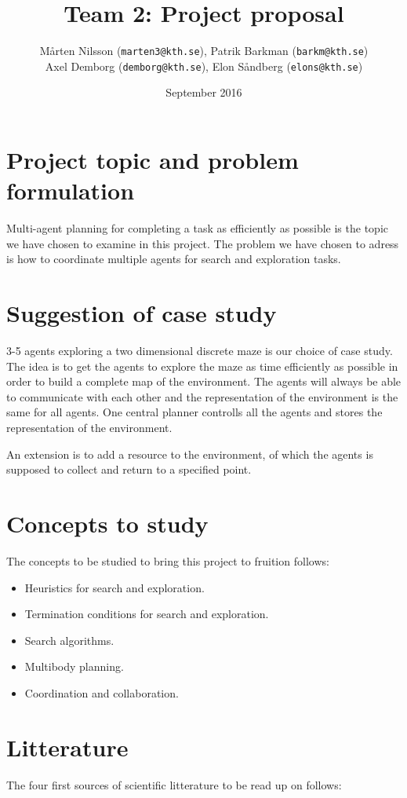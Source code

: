 \documentclass{article}
\title{Team 2: Project proposal}
\author{ Mårten Nilsson (\texttt{marten3@kth.se}), Patrik Barkman (\texttt{barkm@kth.se})\\ Axel Demborg (\texttt{demborg@kth.se}), Elon Såndberg (\texttt{elons@kth.se})}
\date{September 2016}
\begin{document}
\maketitle

\thispagestyle{empty}


\section{Project topic and problem formulation}
Multi-agent planning for completing a task as efficiently as possible is the topic we have chosen to examine in this project. The problem we have chosen to adress is how to coordinate multiple agents for search and exploration tasks.  

\section{Suggestion of case study}

3-5 agents exploring a two dimensional discrete maze is our choice of case study. The idea is to get the agents to explore the maze as time efficiently as possible in order to build a complete map of the environment. The agents will always be able to communicate with each other and the representation of the environment is the same for all agents. One central planner controlls all the agents and stores the representation of the environment. 

An extension is to add a resource to the environment, of which the agents is supposed to collect and return to a specified point.  

\section{Concepts to study}
The concepts to be studied to bring this project to fruition follows:

\begin{itemize}
\item Heuristics for search and exploration. 
\item Termination conditions for search and exploration.
\item Search algorithms. 
\item Multibody planning.
\item Coordination and collaboration.
\end{itemize}

\section{Litterature}
The four first sources of scientific litterature to be read up on follows:
\end{document}
